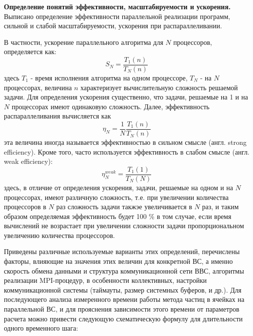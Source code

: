 
\textbf{Определение понятий эффективности, масштабируемости и ускорения.}
Выписано определение эффективности параллельной реализации программ, сильной и слабой масштабируемости, ускорения при распараллеливании.

В частности, ускорение параллельного алгоритма для $N$ процессоров, определяется как:
$$
S_N = \frac{T_1(n)}{T_N(n)}
$$  
здесь $T_1$ - время исполнения алгоритма на одном процессоре, $T_N$ - на $N$ процессорах, величина $n$ характеризует вычислительную сложность решаемой задачи. Для определения ускорения существенно, что задачи, решаемые на 1 и на $N$ процессорах имеют одинаковую сложность.
Далее, эффективность распараллеливания вычисляется как
$$
\eta_N = \frac{1}{N}\frac{T_1(n)}{T_N(n)}
$$  
эта величина иногда называется эффективностью в сильном смысле (англ. strong efficiency). Кроме того, часто используется эффективность в слабом смысле (англ. weak efficiency):
\begin{equation}
\label{weak_eff}
\eta^{weak}_N = \frac{T_1(1)}{T_N(N)}
\end{equation}
здесь, в отличие от определения ускорения, задачи, решаемые на одном и на $N$ процессорах, имеют различную сложность, т.е. при увеличении количества процессоров в $N$ раз сложность задачи такжэе увеличивается в $N$ раз, и таким образом определяемая эффективность будет 100 \% в том случае, если время вычислений не возрастает при увеличении сложности задачи пропорциональном увеличению количества процессоров.   

Приведены различные используемые варианты этих определений, перечислены факторы, влияющие на  значения этих величин для конкретной ВС, а именно скорость обмена данными и структура коммуникационной сети ВВС, алгоритмы реализации MPI-процедур, в особенности коллективных, настройки коммуникационной системы (таймауты, размер системных буферов, и др.).
Для последующего анализа измеренного времени работы метода частиц в ячейках на параллельной ВС, и для прояснения зависимости этого времени от параметров расчета можно привести следующую схематическую формулу для длительности одного временного шага:

